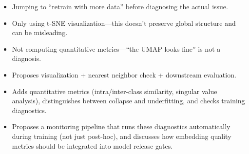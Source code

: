 \begin{interviewq}
\redflags
\begin{itemize}
    \item Jumping to ``retrain with more data'' before diagnosing the actual issue.
    \item Only using t-SNE visualization---this doesn't preserve global structure and can be misleading.
    \item Not computing quantitative metrics---``the UMAP looks fine'' is not a diagnosis.
\end{itemize}


\goodgreat
\begin{itemize}
    \item {} Proposes visualization + nearest neighbor check + downstream evaluation.
    \item {} Adds quantitative metrics (intra/inter-class similarity, singular value analysis), distinguishes between collapse and underfitting, and checks training diagnostics.
    \item {} Proposes a monitoring pipeline that runs these diagnostics automatically during training (not just post-hoc), and discusses how embedding quality metrics should be integrated into model release gates.
\end{itemize}

\end{interviewq}


